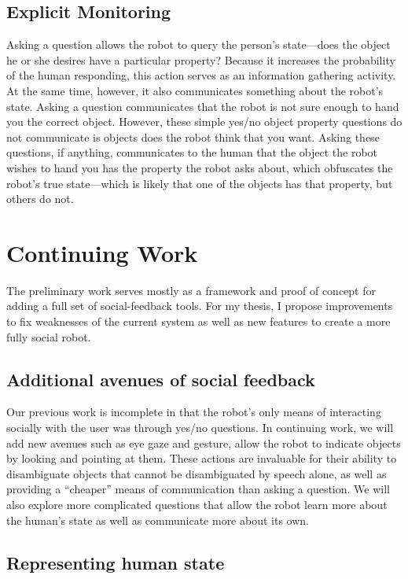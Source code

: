 \documentclass{article}
\begin{document}
\subsection{Explicit Monitoring}

Asking a question allows the robot to query the person's state---does the object he or she desires have a particular property? Because it increases the probability of the human responding, this action serves as an information gathering activity. At the same time, however, it also communicates something about the robot's state. Asking a question communicates that the robot is not sure enough to hand you the correct object. However, these simple yes/no object property questions do not communicate is objects does the robot think that you want. Asking these questions, if anything, communicates to the human that the object the robot wishes to hand you has the property the robot asks about, which obfuscates the robot's true state---which is likely that one of the objects has that property, but others do not. 


\section{Continuing Work}

The preliminary work serves mostly as a framework and proof of concept for adding a full set of social-feedback tools. For my thesis, I propose improvements to fix weaknesses of the current system as well as new features to create a more fully social robot.  

\subsection{Additional avenues of social feedback}

Our previous work is incomplete in that the robot's only means of interacting socially with the user was through yes/no questions. In continuing work, we will add new avenues such as eye gaze and gesture, allow the robot to indicate objects by looking and pointing at them. These actions are invaluable for their ability to disambiguate objects that cannot be disambiguated by speech alone, as well as providing a ``cheaper'' means of communication than asking a question. We will also explore more complicated questions that allow the robot learn more about the human's state as well as communicate more about its own.  

\subsection{Representing human state}
\end{document}
